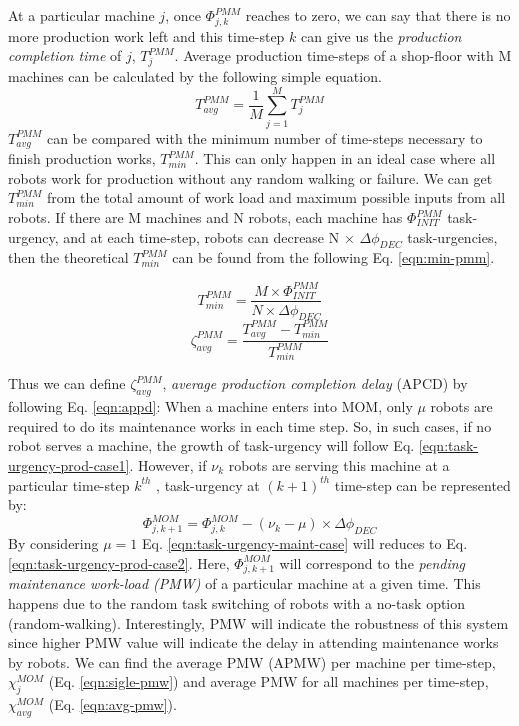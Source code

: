 \documentclass{llncs}
\begin{document}
At a particular machine $j$, once $\Phi_{j, k}^{PMM}$ reaches to zero, we can say that there is no more production work left and this time-step $k$ can give us the {\em production completion time} of $j$, $T_{j}^{PMM}$. Average production time-steps of a shop-floor with M machines can be calculated by the following simple equation.
\begin{equation}
T_{avg}^{PMM} = \frac{1}{M} \sum_{j=1}^{M} T_{j}^{PMM} 
\label{eqn:avg-pmm}
\end{equation}
$T_{avg}^{PMM}$ can be compared with the minimum number of time-steps necessary to finish production works, $T_{min}^{PMM}$. This can only happen in an ideal case where all robots work for production without any random walking or failure. We can get $T_{min}^{PMM}$ from the total amount of work load and maximum possible inputs from all robots. If there are M machines and N robots, each machine has $\Phi_{INIT}^{PMM}$ task-urgency, and at each time-step, robots can decrease N $\times$ $\Delta \phi_{DEC}$ task-urgencies, then the theoretical $T_{min}^{PMM}$ can be found from the following Eq. \ref{eqn:min-pmm}.
%
\begin{multicols}{2}
\small
\begin{equation}
T_{min}^{PMM} = \frac{M \times \Phi_{INIT}^{PMM}}{N \times \Delta \phi_{DEC}} 
\label{eqn:min-pmm}
\end{equation}
\vspace*{0.2cm}
\begin{equation}
\zeta_{avg}^{PMM} = \frac{T_{avg}^{PMM} - T_{min}^{PMM}}{T_{min}^{PMM}} 
\label{eqn:appd}
\end{equation}
\end{multicols}
Thus we can define $\zeta_{avg}^{PMM}$, {\em average production completion delay} (APCD) by following Eq. \ref{eqn:appd}:
When a machine enters into MOM, only $\mu$ robots are required to do its maintenance works in each time step. So, in such cases, if no robot serves a machine, the growth of task-urgency will follow Eq. \ref{eqn:task-urgency-prod-case1}. However, if $\nu_{k}$ robots are serving this machine at a particular time-step $k^{th}$ , task-urgency at $(k+1)^{th}$ time-step can be represented by:
\begin{equation}
\Phi_{j, k+1}^{MOM} = \Phi_{j, k}^{MOM}- (\nu_{k} - \mu) \times \Delta \phi_{DEC}
\label{eqn:task-urgency-maint-case}
\end{equation}
By considering $\mu = 1$ Eq. \ref{eqn:task-urgency-maint-case} will reduces to Eq. \ref{eqn:task-urgency-prod-case2}. Here, $\Phi_{j, k+1}^{MOM}$ will correspond to the {\em pending maintenance work-load (PMW)} of a particular machine at a given time. This happens due to the random task switching of robots with a no-task option (random-walking). Interestingly, PMW will indicate the robustness of this system since higher PMW value will indicate the delay in attending maintenance works by robots. We can find the average PMW (APMW) per machine per time-step, $\chi_{j}^{MOM}$ (Eq. \ref{eqn:sigle-pmw}) and average PMW for all machines per time-step, $\chi_{avg}^{MOM}$ (Eq. \ref{eqn:avg-pmw}).
\end{document}
